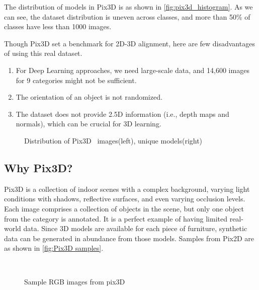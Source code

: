 The distribution of models in Pix3D is as shown in \autoref{fig:pix3d_histogram}.
As we can see, the dataset distribution is uneven across classes, and more than 50\% of classes have less than 1000 images.

Though Pix3D set a benchmark for 2D-3D alignment, here are few disadvantages of using this real dataset.
\begin{enumerate}
    \item For Deep Learning approaches, we need large-scale data, and 14,600 images for 9 categories might not be sufficient.
    \item The orientation of an object is not randomized.
    \item The dataset does not provide 2.5D information (i.e., depth maps and normals), which can be crucial for 3D learning.
\end{enumerate}

\begin{figure}[!ht]
    \resizebox{0.49\textwidth}{6cm}{}
    \resizebox{0.49\textwidth}{6cm}{}
    \caption{Distribution of Pix3D~\cite{pix3d} images(left), unique models(right)}
    \label{fig:pix3d_histogram}
\end{figure}

\subsection{Why Pix3D?}\label{subsec:why-pix3d?}
Pix3D is a collection of indoor scenes with a complex background, varying light conditions with shadows, reflective surfaces, and even varying occlusion levels.
Each image comprises a collection of objects in the scene, but only one object from the category is annotated.
It is a perfect example of having limited real-world data.
Since 3D models are available for each piece of furniture, synthetic data can be generated in abundance from those models.
Samples from Pix2D are as shown in \autoref{fig:Pix3D samples}.

\begin{figure}[!ht]
    \centering
    \quad
    \\
    \quad
    \caption{Sample RGB images from pix3D}
    \label{fig:Pix3D samples}
\end{figure}


